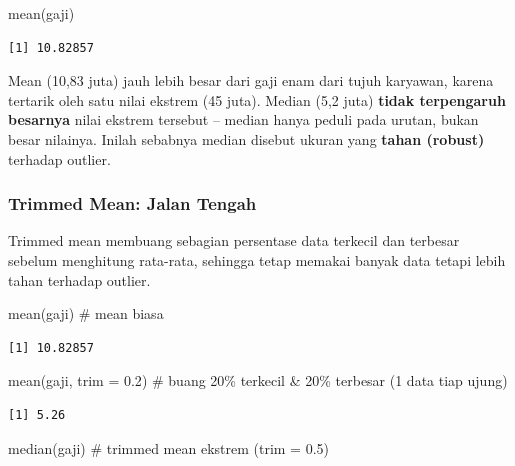 \documentclass[
  indonesian,
  letterpaper,
]{book}
\newenvironment{Shaded}{\begin{snugshade}}{\end{snugshade}}
\newcommand{\AttributeTok}[1]{\textcolor[rgb]{0.40,0.45,0.13}{#1}}
\newcommand{\CommentTok}[1]{\textcolor[rgb]{0.37,0.37,0.37}{#1}}
\newcommand{\FloatTok}[1]{\textcolor[rgb]{0.68,0.00,0.00}{#1}}
\newcommand{\FunctionTok}[1]{\textcolor[rgb]{0.28,0.35,0.67}{#1}}
\newcommand{\NormalTok}[1]{\textcolor[rgb]{0.00,0.23,0.31}{#1}}
\begin{document}
\begin{Shaded}
\begin{Highlighting}[]
\FunctionTok{mean}\NormalTok{(gaji)}
\end{Highlighting}
\end{Shaded}

\begin{verbatim}
[1] 10.82857
\end{verbatim}

Mean (10,83 juta) jauh lebih besar dari gaji enam dari tujuh karyawan,
karena tertarik oleh satu nilai ekstrem (45 juta). Median (5,2 juta)
\textbf{tidak terpengaruh besarnya} nilai ekstrem tersebut -- median
hanya peduli pada urutan, bukan besar nilainya. Inilah sebabnya median
disebut ukuran yang \textbf{tahan (robust)} terhadap outlier.

\subsubsection{Trimmed Mean: Jalan
Tengah}\label{trimmed-mean-jalan-tengah}

Trimmed mean membuang sebagian persentase data terkecil dan terbesar
sebelum menghitung rata-rata, sehingga tetap memakai banyak data tetapi
lebih tahan terhadap outlier.

\begin{Shaded}
\begin{Highlighting}[]
\FunctionTok{mean}\NormalTok{(gaji)                }\CommentTok{\# mean biasa}
\end{Highlighting}
\end{Shaded}

\begin{verbatim}
[1] 10.82857
\end{verbatim}

\begin{Shaded}
\begin{Highlighting}[]
\FunctionTok{mean}\NormalTok{(gaji, }\AttributeTok{trim =} \FloatTok{0.2}\NormalTok{)    }\CommentTok{\# buang 20\% terkecil \& 20\% terbesar (1 data tiap ujung)}
\end{Highlighting}
\end{Shaded}

\begin{verbatim}
[1] 5.26
\end{verbatim}

\begin{Shaded}
\begin{Highlighting}[]
\FunctionTok{median}\NormalTok{(gaji)              }\CommentTok{\# trimmed mean ekstrem (trim = 0.5)}
\end{Highlighting}
\end{Shaded}
\end{document}
